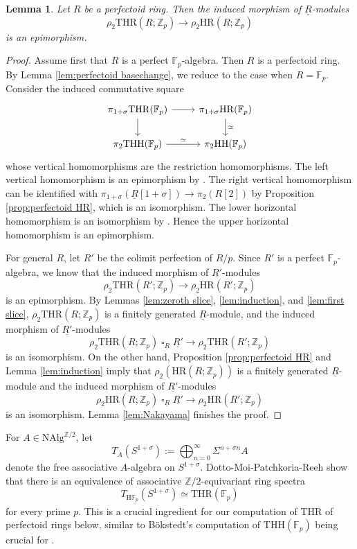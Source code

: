 \documentclass[10pt]{amsart}
\newtheorem{lem}[thm]{Lemma}
\theoremstyle{definition}
\numberwithin{equation}{section}
\newcommand{\F}{\mathbb{F}}
\newcommand{\Z}{\mathbb{Z}}
\newcommand{\rH}{\mathrm{H}}
\newcommand{\ul}{\underline}
\newcommand{\NAlg}{\mathrm{NAlg}}
\DeclareMathOperator{\sotimes}{\square}
\newcommand{\HH}{\mathrm{HH}}
\newcommand{\HR}{\mathrm{HR}}
\newcommand{\THH}{\mathrm{THH}}
\newcommand{\THR}{\mathrm{THR}}
\begin{document}
\begin{lem}
\label{lem:second slice}
Let $R$ be a perfectoid ring.
Then the induced morphism of $\ul{R}$-modules
\[
\rho_2 \THR(R;\Z_p)
\to
\rho_2 \HR(R;\Z_p)
\]
is an epimorphism. 
\end{lem}
\begin{proof}
Assume first that $R$ is a perfect $\F_p$-algebra.
Then $R$ is a perfectoid ring.
By Lemma \ref{lem:perfectoid basechange},
we reduce to the case when $R=\F_p$.
Consider the induced commutative square
\begin{equation}
\label{eqn:second slice}
\begin{tikzcd}
\pi_{1+\sigma}\THR(\F_p)\ar[d]\ar[r]&
\pi_{1+\sigma}\HR(\F_p)\ar[d,"\simeq"]
\\
\pi_2\THH(\F_p)\ar[r,"\simeq"]&
\pi_2\HH(\F_p)
\end{tikzcd}
\end{equation}
whose vertical homomorphisms are the restriction homomorphisms.
The left vertical homomorphism is an epimorphism by \cite[Lemma 5.18(ii)]{DMPR21}.
The right vertical homomorphism can be identified with $\pi_{1+\sigma}(\ul{R}[1+\sigma])\to \pi_2(R[2])$ by Proposition \ref{prop:perfectoid HR},
which is an isomorphism.
The lower horizontal homomorphism is an isomorphism by \cite[Proposition IV.4.2]{NS}.
Hence the upper horizontal homomorphism is an epimorphism.

For general $R$,
let $R'$ be the colimit perfection of $R/p$.
Since $R'$ is a perfect $\F_p$-algebra,
we know that the induced morphism of $\ul{R'}$-modules
\[
\rho_2 \THR(R';\Z_p)
\to
\rho_2 \HR(R';\Z_p)
\]
is an epimorphism.
By Lemmas \ref{lem:zeroth slice}, \ref{lem:induction}, and \ref{lem:first slice},
$\rho_2\THR(R;\Z_p)$ is a finitely generated $\ul{R}$-module,
and the induced morphism of $\ul{R'}$-modules
\[
\rho_2 \THR(R;\Z_p)\sotimes_{\ul{R}}\ul{R'}
\to
\rho_2 \THR(R';\Z_p)
\]
is an isomorphism.
On the other hand,
Proposition \ref{prop:perfectoid HR} and
Lemma \ref{lem:induction} imply that $\rho_2(\HR(R;\Z_p))$ is a finitely generated $\ul{R}$-module and the induced morphism of $\ul{R'}$-modules
\[
\rho_2 \HR(R;\Z_p)\sotimes_{\ul{R}} \ul{R'}
\to
\rho_2\HR(R';\Z_p)
\]
is an isomorphism.
Lemma \ref{lem:Nakayama} finishes the proof.
\end{proof}



For $A\in \NAlg^{\Z/2}$,
let
\[
T_A(S^{1+\sigma})
:=
\bigoplus_{n=0}^\infty
\Sigma^{n+\sigma n} A
\]
denote the free associative $A$-algebra on $S^{1+\sigma}$.
Dotto-Moi-Patchkoria-Reeh \cite[Theorem 5.15]{DMPR21} show that there is an equivalence of associative $\Z/2$-equivariant ring spectra
\begin{equation}
T_{\rH \ul{\F_p}}(S^{1+\sigma})
\simeq
\THR(\F_p)
\end{equation}
for every prime $p$.
This is a crucial ingredient for our computation of $\THR$ of perfectoid rings below, similar to  B{\"o}kstedt's computation of $\THH(\F_p)$ being crucial for \cite{BMS19}.
\end{document}
